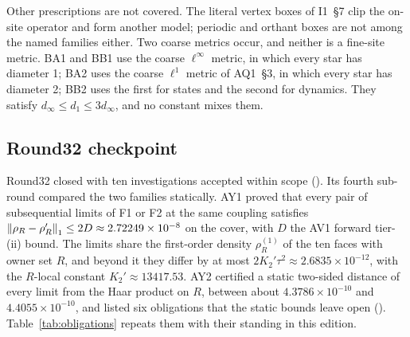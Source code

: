 Other prescriptions are not covered. The literal vertex boxes of I1~\S7 clip
the on-site operator and form another model; periodic and orthant boxes are
not among the named families either. Two coarse metrics occur, and neither is
a fine-site metric. BA1 and BB1 use the coarse $\ell^\infty$ metric, in which
every star has diameter 1; BA2 uses the coarse $\ell^1$ metric of AQ1~\S3, in
which every star has diameter 2; BB2 uses the first for states and the second
for dynamics. They satisfy $d_\infty\le d_1\le3d_\infty$, and no
constant mixes them.

\subsection{Round32 checkpoint}
\label{sec:checkpoint}

Round32 closed with ten investigations accepted within scope
(). Its fourth
sub-round compared the two families statically. AY1 proved that every pair of
subsequential limits of F1 or F2 at the same coupling satisfies
$\left\lVert\rho_R-\rho'_R\right\rVert_1\le2D\approx2.72249\times10^{-8}$ on the cover, with
$D$ the AV1 forward tier-(ii) bound. The limits share the first-order density
$\rho^{(1)}_R$ of the ten faces with owner set $R$, and beyond it they differ
by at most $2K_2'\tau^2\approx2.6835\times10^{-12}$, with the $R$-local
constant $K_2'\approx13417.53$. AY2 certified a static two-sided distance of
every limit from the Haar product on $R$, between about $4.3786\times10^{-10}$
and $4.4055\times10^{-10}$, and listed six obligations that the static bounds
leave open ().
Table~\ref{tab:obligations} repeats them with their standing in this edition.

